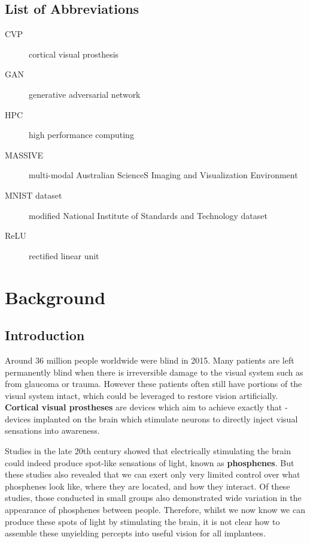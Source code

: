 \documentclass[a4paper,11pt,openany]{book}
\begin{document}
\clearpage

\setcounter{tocdepth}{3}
\tableofcontents

\chapter*{List of Abbreviations}

\begin{description}
\item[{CVP}] cortical visual prosthesis
\item[{GAN}] generative adversarial network
\item[{HPC}] high performance computing
\item[{MASSIVE}] multi-modal Australian ScienceS Imaging and Visualization Environment
\item[{MNIST dataset}] modified National Institute of Standards and Technology dataset
\item[{ReLU}] rectified linear unit
\end{description}

\listoftables
\listoffigures

\part{Background}
\label{sec:org70762b9}

\chapter{Introduction}
\label{sec:org57ee436}

Around 36 million people worldwide were blind in 2015. \cite{bourne_magnitude_2017,flaxman_global_2017}
Many patients are left permanently blind when there is irreversible damage to the visual system such as from glaucoma or trauma. \cite{lee_glaucoma_2005,zachariades_blindness_1996}
However these patients often still have portions of the visual system intact, which could be leveraged to restore vision artificially.
\textbf{Cortical visual prostheses} are devices which aim to achieve exactly that - devices implanted on the brain which stimulate neurons to directly inject visual sensations into awareness. \cite{normann_toward_2009,lewis_restoration_2015,foroushani_cortical_2018}

Studies in the late 20th century showed that electrically stimulating the brain could indeed produce spot-like sensations of light, known as \textbf{phosphenes}. \cite{brindley_sensations_1968,dobelle_phosphenes_1974,bak_visual_1990,bosking_electrical_2017}
But these studies also revealed that we can exert only very limited control over what phosphenes look like, where they are located, and how they interact. \cite{rushton_properties_1978,dobelle_phosphenes_1974,schmidt_feasibility_1996}
Of these studies, those conducted in small groups also demonstrated wide variation in the appearance of phosphenes between people. \cite{dobelle_phosphenes_1974,bak_visual_1990}
Therefore, whilst we now know we can produce these spots of light by stimulating the brain, it is not clear how to assemble these unyielding percepts into useful vision for all implantees. \cite{fernandez_development_2005,beyeler_learning_2017}
\end{document}

